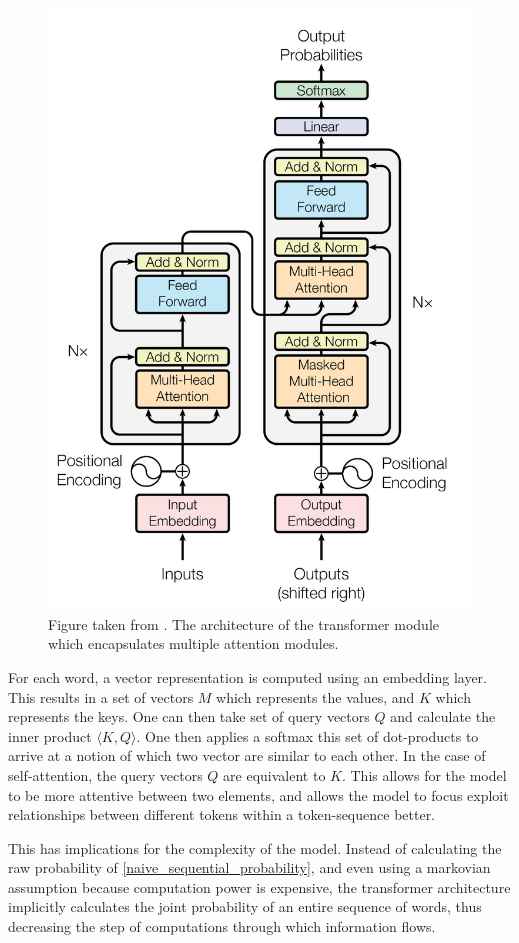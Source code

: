 \documentclass[a4paper,12pt,twoside,openright]{report}
\begin{document}
\begin{figure}[H]
	\center
  \includegraphics[width=0.5\linewidth]{./assets/background/transformer_module.png}
  \caption{Figure taken from \cite{vaswani17}. The architecture of the transformer module which encapsulates multiple attention modules.}
  \label{fig:attention_is_all_you_need}
\end{figure}


For each word, a vector representation is computed using an embedding layer.
This results in a set of vectors $M$ which represents the values, and $K$ which represents the keys.
One can then take set of query vectors $Q$ and calculate the inner product $\langle K, Q \rangle$.
One then applies a softmax this set of dot-products to arrive at a notion of which two vector are similar to each other.
In the case of self-attention, the query vectors $Q$ are equivalent to $K$.
This allows for the model to be more attentive between two elements, and allows the model to focus exploit relationships between different tokens within a token-sequence better.


This has implications for the complexity of the model.
Instead of calculating the raw probability of \eqref{naive_sequential_probability}, and even using a markovian assumption because computation power is expensive, the transformer architecture implicitly calculates the joint probability of an entire sequence of words, thus decreasing the step of computations through which information flows. \\
\end{document}
